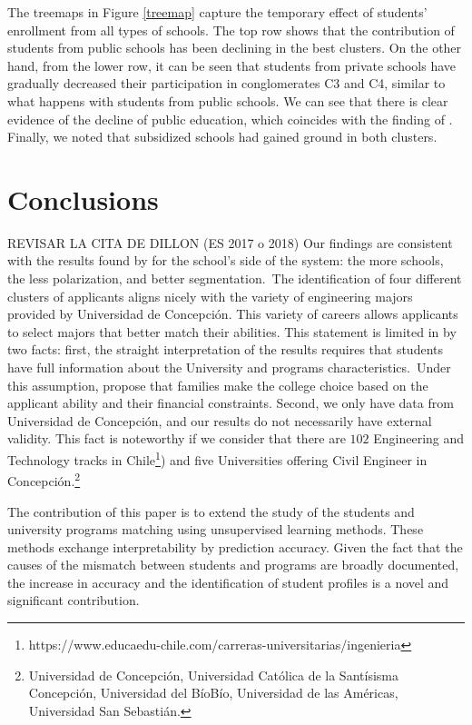 \documentclass[5p,authoryear,preprint,12pt]{elsarticle}
\begin{document}
The treemaps in Figure \ref{treemap} capture the temporary effect of students' enrollment from all types of schools. The top row shows that the contribution of students from public schools has been declining in the best clusters. On the other hand, from the lower row, it can be seen that students from private schools have gradually decreased their participation in conglomerates C3 and C4, similar to what happens with students from public schools. We can see that there is clear evidence of the decline of public education, which coincides with the finding of \citep{paredes2009fin}. Finally, we noted that subsidized schools had gained ground in both clusters.


\section{Conclusions}
REVISAR LA CITA DE DILLON (ES 2017 o 2018)
Our findings are consistent with the results found by \citep{sallee2008} for the school's side of the system: the more schools, the less polarization, and better segmentation. The identification of four different clusters of applicants aligns nicely with the variety of engineering majors provided by Universidad de Concepci\'on. This variety of careers allows applicants to select majors that better match their abilities. This statement is limited in by two facts: first, the straight interpretation of the results requires that students have full information about the University and programs characteristics. Under this assumption, \citet{dillon2018} propose that families make the college choice based on the applicant ability and their financial constraints. Second, we only have data from Universidad de Concepci\'on, and our results do not necessarily have external validity. This fact is noteworthy if we consider that there are $102$ Engineering and Technology tracks in Chile\footnote{https://www.educaedu-chile.com/carreras-universitarias/ingenieria}) and five Universities offering Civil Engineer in Concepci\'on.\footnote{Universidad de Concepci\'on, Universidad Cat\'olica de la Sant\'isisma Concepci\'on, Universidad del B\'ioB\'io, Universidad de las Am\'ericas, Universidad San Sebasti\'an.}

The contribution of this paper is to extend the study of the students and university programs matching using unsupervised learning methods. These methods exchange interpretability by prediction accuracy. Given the fact that the causes of the mismatch between students and programs are broadly documented, the increase in accuracy and the identification of student profiles is a novel and significant contribution.
\end{document}
